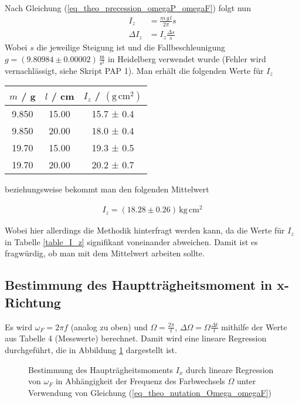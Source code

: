 \documentclass[12pt,a4paper,german]{scrartcl}
\numberwithin{equation}{section}
\begin{document}
  Nach Gleichung (\ref{eq_theo_precession_omegaP_omegaF}) folgt nun
  \begin{align}
    I_z &= \frac{m \, g \, l}{2 \pi} s \nonumber \\
    \Delta I_z &= I_z \frac{\Delta s}{s}
  \end{align}
  Wobei $s$ die jeweilige Steigung ist und die Fallbeschleunigung $g = (9.80984 \pm 0.00002) \, \frac{\text{m}}{\text{s}^2}$ in Heidelberg verwendet wurde (Fehler wird vernachlässigt, siehe Skript PAP 1). Man erhält die folgenden Werte für $I_z$

  \begin{center}
    \begin{tabular}{c | c | c}
      $m$ / g & $l$ / cm & $I_z$ / $(\text{g} \, \text{cm}^2)$ \\
      \hline
      9.850 & 15.00 & 15.7 ± 0.4 \\
      9.850 & 20.00 & 18.0 ± 0.4 \\
      19.70 & 15.00 & 19.3 ± 0.5 \\
      19.70 & 20.00 & 20.2 ± 0.7
    \end{tabular}
    \label{table_I_z}
  \end{center}

  beziehungsweise bekommt man den folgenden Mittelwert

  \begin{align}
    I_z = (18.28 \pm 0.26) \, \text{kg} \, \text{cm}^2
  \end{align}

  Wobei hier allerdings die Methodik hinterfragt werden kann, da die Werte für $I_z$ in Tabelle \ref{table_I_z} signifikant voneinander abweichen.
  Damit ist es fragwürdig, ob man mit dem Mittelwert arbeiten sollte.

  \subsection{Bestimmung des Hauptträgheitsmoment in x-Richtung}
  Es wird $\omega_F = 2 \pi f$ (analog zu oben) und $\Omega = \frac{2 \pi}{t}$, $\Delta \Omega = \Omega \frac{\Delta t}{t}$ mithilfe der Werte aus Tabelle 4 (Messwerte) berechnet.
  Damit wird eine lineare Regression durchgeführt, die in Abbildung \ref{fig_I_x_1} dargestellt ist.

  \begin{figure}[H]
    \centering
    
    \caption{Bestimmung des Haupträgheitsmoments $I_x$ durch lineare Regression von $\omega_F$ in Abhängigkeit der Frequenz des Farbwechsels $\Omega$ unter Verwendung von Gleichung (\ref{eq_theo_nutation_Omega_omegaF})}
    \label{fig_I_x_1}
  \end{figure}
\end{document}
